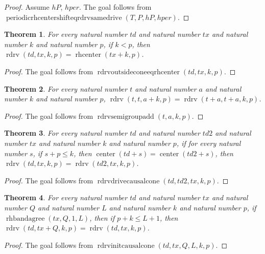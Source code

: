 \documentclass[11pt]{article}
\newtheorem{theorem}{Theorem}[section]
\theoremstyle{definition}
\begin{document}
\begin{proof}
Assume \(hP\), \(hper\).
The goal follows from \(\operatorname{periodicrhcentershifteqrdrvsamedrive}(T, P, hP, hper)\).
\end{proof}
\begin{theorem}
\label{ll:paper:rdrv-outside-cone-eq-rhcenter}
For every natural number \(td\) and natural number \(tx\) and natural number \(k\) and natural number \(p\), if \(k < p\), then \(\operatorname{rdrv}(td, tx, k, p) = \operatorname{rhcenter}(tx + k, p)\).
\end{theorem}
\begin{proof}
The goal follows from \(\operatorname{rdrvoutsideconeeqrhcenter}(td, tx, k, p)\).
\end{proof}
\begin{theorem}
\label{ll:paper:rdrv-semigroup-add}
For every natural number \(t\) and natural number \(a\) and natural number \(k\) and natural number \(p\), \(\operatorname{rdrv}(t, t, a + k, p) = \operatorname{rdrv}(t + a, t + a, k, p)\).
\end{theorem}
\begin{proof}
The goal follows from \(\operatorname{rdrvsemigroupadd}(t, a, k, p)\).
\end{proof}
\begin{theorem}
\label{ll:paper:rdrv-drive-causal-cone}
For every natural number \(td\) and natural number \(td2\) and natural number \(tx\) and natural number \(k\) and natural number \(p\), if for every natural number \(s\), if \(s + p \le k\), then \(\operatorname{center}(td + s) = \operatorname{center}(td2 + s)\), then \(\operatorname{rdrv}(td, tx, k, p) = \operatorname{rdrv}(td2, tx, k, p)\).
\end{theorem}
\begin{proof}
The goal follows from \(\operatorname{rdrvdrivecausalcone}(td, td2, tx, k, p)\).
\end{proof}
\begin{theorem}
\label{ll:paper:rdrv-init-causal-cone}
For every natural number \(td\) and natural number \(tx\) and natural number \(Q\) and natural number \(L\) and natural number \(k\) and natural number \(p\), if \(\operatorname{rhbandagree}(tx, Q, 1, L)\), then if \(p + k \le L + 1\), then \(\operatorname{rdrv}(td, tx + Q, k, p) = \operatorname{rdrv}(td, tx, k, p)\).
\end{theorem}
\begin{proof}
The goal follows from \(\operatorname{rdrvinitcausalcone}(td, tx, Q, L, k, p)\).
\end{proof}
\end{document}
